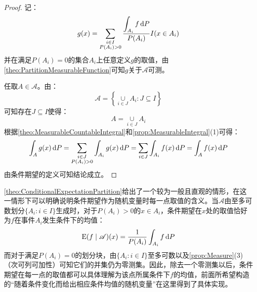 \begin{proof}
	记：
	\begin{equation*}
		g(x)=\sum_{\substack{i\in I\\P(A_i)>0}}\frac{\displaystyle\int_{A_i}f\mathop{}\!\mathrm{d} P}{P(A_i)}I(x\in A_i)
	\end{equation*}
	并在满足$P(A_i)=0$的集合$A_i$上任意定义$g$的取值，由\cref{theo:PartitionMeasurableFunction}可知$g$关于$\mathscr{A}$可测。\par
	任取$A\in\mathscr{A}$。由：
	\begin{equation*}
		\mathscr{A}=\left\{\underset{i\in J}{\cup}A_i:J\subseteq I\right\}
	\end{equation*}
	可知存在$J\subseteq I$使得：
	\begin{equation*}
		A=\underset{i\in J}{\cup}A_i
	\end{equation*}
	根据\cref{theo:MeasurableCountableIntegral}和\cref{prop:MeasurableIntegral}(1)可得：
	\begin{align*}
		\int_{A}g(x)\mathop{}\!\mathrm{d} P=\sum_{\substack{i\in J\\P(A_i)>0}}\int_{A_i}g(x)\mathop{}\!\mathrm{d} P=\sum_{i\in J}\int_{A_i}f(x)\mathop{}\!\mathrm{d} P=\int_{A}f(x)\mathop{}\!\mathrm{d} P
	\end{align*}
	由条件期望的定义可知结论成立。
\end{proof}
\cref{theo:ConditionalExpectationPartition}给出了一个较为一般且直观的情形，在这一情形下可以明确说明条件期望作为随机变量时每一点取值的含义。当$\mathscr{A}$由至多可数划分$\{A_i:i\in I\}$生成时，对于$P(A_i)>0$的$x\in A_i$，条件期望在$x$处的取值恰好为$f$在事件$A_i$发生条件下的均值：
\begin{equation*}
	\operatorname{E}(f\mid\mathscr{A})(x)=\frac{1}{P(A_i)}\int_{A_i}f\mathop{}\!\mathrm{d} P
\end{equation*}
而对于满足$P(A_i)=0$的划分块，由$\{A_i:i\in I\}$至多可数以及\cref{prop:Measure}(3)（次可列可加性）可知它们的并集仍为零测集。因此，除去一个零测集以后，条件期望在每一点的取值都可以具体理解为该点所属条件下$f$的均值，前面所希望构造的“随着条件变化而给出相应条件均值的随机变量”在这里得到了具体实现。
